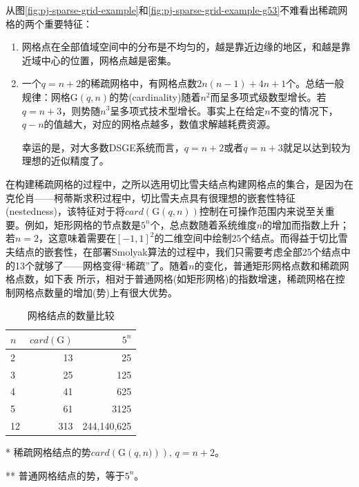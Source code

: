 从图\ref{fig:pj-sparse-grid-example}和\ref{fig:pj-sparse-grid-example-g53}不难看出稀疏网格的两个重要特征：
\begin{enumerate}
  \item 网格点在全部值域空间中的分布是不均匀的，越是靠近边缘的地区，和越是靠近域中心的位置，网格点越是密集。
  \item 一个$q=n+2$的稀疏网格中，有网格点数$2n(n-1)+4n+1$个。总结一般规律：网格$\mathrm{G}(q,n)$的势(cardinality)随着$n^{2}$而呈多项式级数型增长。若$q = n+3$，则势随$n^{3}$呈多项式技术型增长。事实上在给定$n$不变的情况下，$q-n$的值越大，对应的网格点越多，数值求解越耗费资源。

  幸运的是，对大多数DSGE系统而言，$q=n+2$或者$q=n+3$就足以达到较为理想的近似精度了。
\end{enumerate}

在构建稀疏网格的过程中，之所以选用切比雪夫结点构建网格点的集合，是因为在克伦肖——柯蒂斯求积过程中，切比雪夫点具有很理想的嵌套性特征(nestedness)，该特征对于将$card \left( \mathrm{G}(q,n)\right)$控制在可操作范围内来说至关重要。例如，矩形网格的节点数是$5^n$个，总点数随着系统维度$n$的增加而指数上升；若$n=2$，这意味着需要在$[-1,1]^{2}$的二维空间中绘制$25$个结点。而得益于切比雪夫结点的嵌套性，在部署Smolyak算法的过程中，我们只需要考虑全部25个结点中的13个就够了——网格变得``稀疏''了。随着$n$的变化，普通矩形网格点数和稀疏网格点数，如下表%
所示，相对于普通网格(如矩形网格)的指数增速，稀疏网格在控制网格点数量的增加(势)上有很大优势。

\begin{table}[htbp]
  \label{tab:simDisimCoefNewDef}
\begin{center}
    \centering
    \caption{网格结点的数量比较}
    \begin{threeparttable}
    \begin{tabular}{lrr}
        \hline
        $n$ & $card \left( \mathrm{G} \right)$\tnote{*} & $5^{n}$ \tnote{**}\\
        \hline
        2 & 13 & 25 \\
        3 & 25 & 125 \\
        4 & 41 & 625 \\
        5 & 61 & 3125 \\
        12 & 313 & 244,140,625 \\
        \hline
    \end{tabular}
    \begin{tablenotes}
        \footnotesize
        \item[*] \tiny{稀疏网格结点的势$card \left( \mathrm{G} \left( q,n) \right) \right), \, q=n+2$。}
        \item[**] \tiny{普通网格结点的势，等于$5^{n}$。}
    \end{tablenotes}
\end{threeparttable}
\end{center}
\end{table}


